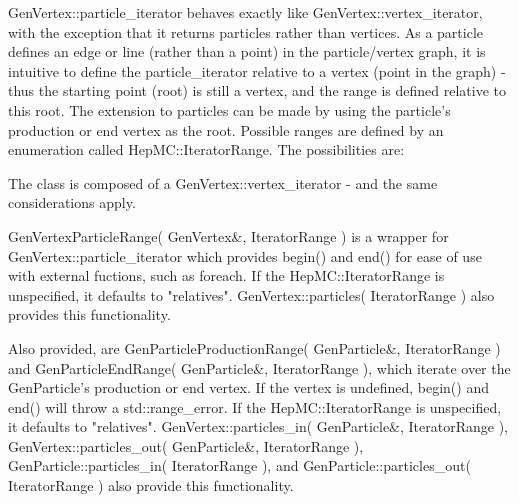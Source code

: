 \documentclass[11pt,letterpaper]{article}
\begin{document}
GenVertex::particle\_iterator behaves exactly like
GenVertex::vertex\_iterator, with the exception that it returns particles
rather than vertices.  As a particle defines an edge or line (rather
than a point) in the particle/vertex graph, it is intuitive to define
the particle\_iterator relative to a vertex (point in the graph) - thus
the starting point (root) is still a vertex, and the range is defined
relative to this root.  The extension to particles can be made by
using the particle's production or end vertex as the root.  Possible
ranges are defined by an enumeration called HepMC::IteratorRange.
The possibilities are:
\begin{itemize}\setlength{\itemsep}{0pt}
\end{itemize}

The class is composed of a GenVertex::vertex\_iterator - 
and the same considerations apply.

GenVertexParticleRange( GenVertex\&, IteratorRange ) is a wrapper for
GenVertex::particle\_iterator which provides begin() and end() for
ease of use with external fuctions, such as foreach.
If the HepMC::IteratorRange is unspecified, it defaults to "relatives".
GenVertex::particles( IteratorRange ) also provides this functionality.

Also provided, are GenParticleProductionRange( GenParticle\&, IteratorRange )
and GenParticleEndRange( GenParticle\&, IteratorRange ), 
which iterate over the GenParticle's production or end vertex.  
If the vertex is undefined, begin() and end() will throw a std::range\_error.
If the HepMC::IteratorRange is unspecified, it defaults to "relatives".
GenVertex::particles\_in( GenParticle\&, IteratorRange ),
GenVertex::particles\_out( GenParticle\&, IteratorRange ),
GenParticle::particles\_in( IteratorRange ), and
GenParticle::particles\_out( IteratorRange ) also provide this functionality.
\end{document}
